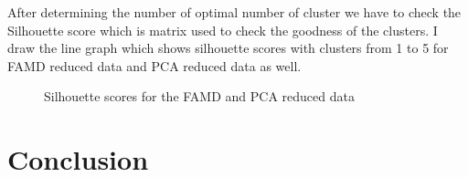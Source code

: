 \documentclass[12pt]{article}
\begin{document}
After determining the number of optimal number of cluster we have to check the Silhouette score which is matrix used to check the goodness of the clusters. I draw the line graph which shows silhouette scores with clusters from 1 to 5 for FAMD reduced data and PCA reduced data as well.
\begin{figure}[h!]
	\centering
	\qquad
	\caption{Silhouette scores for the FAMD and PCA reduced data}%
	\label{fig:scores}%
\end{figure}
\section{Conclusion}


\singlespacing



\end{document}
